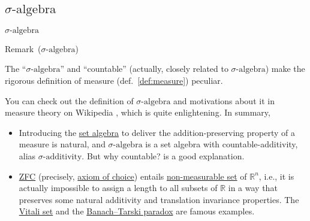 \documentclass[utf-8, 10pt, aspectratio=1610]{beamer}
\begin{document}
\subsection{\(\sigma \text{-algebra} \)}
\begin{frame}{\(\sigma \text{-algebra} \)}
	\begin{block}{Remark\ (\(\sigma \text{-algebra} \))}
		\par The ``\(\sigma \text{-algebra} \)'' and ``countable'' (actually, closely related to \(\sigma \text{-algebra} \)) make the rigorous definition of measure (def.~\ref{def:measure}) peculiar.
		\par You can check out the definition of \(\sigma \text{-algebra}\) and motivations about it in measure theory on Wikipedia \cite{enwiki:1173641705} , which is quite enlightening. In summary,
		\begin{itemize}
			\item Introducing the \href{https://en.wikipedia.org/wiki/Field_of_sets}{set algebra} to deliver the addition-preserving property of a measure is natural, and \(\sigma \text{-algebra} \) is a set algebra with countable-additivity, alias \(\sigma \text{-additivity} \). But why countable? \cite{566154}  is a good explanation.
			\item \href{https://en.wikipedia.org/wiki/Zermelo-Fraenkel_set_theory}{ZFC} (precisely, \href{https://en.wikipedia.org/wiki/Axiom_of_choice}{axiom of choice}) entails \href{https://en.wikipedia.org/wiki/Non-measurable_set}{non-measurable set} of \(\mathbb{R}^n\), i.e., it is actually impossible to assign a length to all subsets of \(\mathbb{R}\) in a way that preserves some natural additivity and translation invariance properties.   The \href{https://en.wikipedia.org/wiki/Vitali_set}{Vitali set} and the \href{https://en.wikipedia.org/wiki/Banach-Tarski_paradox}{Banach–Tarski paradox} are famous examples.
		\end{itemize}
	\end{block}
\end{frame}
\end{document}
